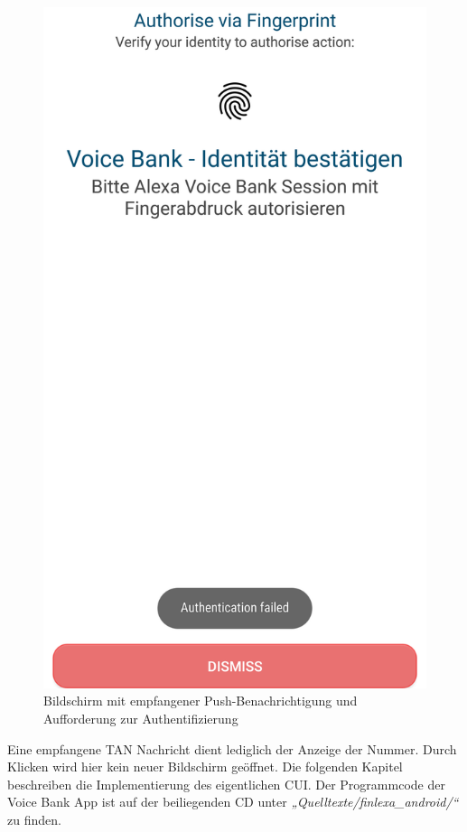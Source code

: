 \begin{figure}[h]
\begin{minipage}[b]{0.45\textwidth}
  \end{minipage}
  \begin{minipage}[b]{0.45\textwidth}
    \includegraphics[width=\textwidth]{bilder/4_appAuthorise.png}
  \end{minipage}
  \caption{Bildschirm mit empfangener Push-Benachrichtigung und Aufforderung zur Authentifizierung}
  \label{fig:app-auth}
\end{figure}

Eine empfangene \ac{TAN} Nachricht dient lediglich der Anzeige der Nummer. Durch Klicken wird hier kein neuer Bildschirm geöffnet. Die folgenden Kapitel beschreiben die Implementierung des eigentlichen \ac{CUI}. Der Programmcode der Voice Bank App ist auf der beiliegenden CD unter \textit{„Quelltexte/finlexa\_android/“} zu finden.

